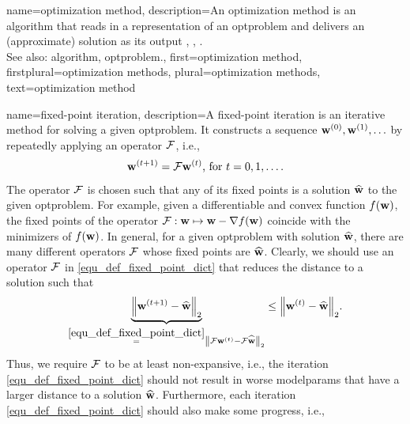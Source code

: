{name={optimization method},
	description={An optimization method is an \gls{algorithm} that 
		reads in a representation of an \gls{optproblem} and delivers an (approximate) solution 
		as its output \cite{BoydConvexBook}, \cite{BertsekasNonLinProgr}, \cite{nesterov04}.
		 \\
		 See also: \gls{algorithm}, \gls{optproblem}.},
	first={optimization method},
	firstplural={optimization methods}, 
	plural={optimization methods}, 
	text={optimization method}
}

{name={fixed-point iteration},
	description={A fixed-point iteration is an iterative method for solving 
		a given \gls{optproblem}. It constructs a sequence ${\bf w}^{(0)}, {\bf w}^{(1)}, \ldots$ by 
		 repeatedly applying an operator $\mathcal{F}$, i.e., 
		 \begin{equation} 
		 	\label{equ_def_fixed_point_dict} 
		 	{\bf w}^{(t+1)} = \mathcal{F} {\bf w}^{(t)} \mbox{, for } t=0, 1, \ldots.
		 \end{equation} 
		 The operator $\mathcal{F}$ is chosen such that any of its fixed points is a solution 
		 $\widehat{{\bf w}}$ to the given \gls{optproblem}. For example, given a \gls{differentiable} and 
		 \gls{convex} \gls{function} $f({\bf w})$, the fixed points of the operator $\mathcal{F}: {\bf w} \mapsto {\bf w} - \nabla f({\bf w})$ 
		 coincide with the minimizers of $f({\bf w})$. In general, for a given \gls{optproblem} with solution $\widehat{{\bf w}}$, 
		 there are many different operators $\mathcal{F}$ whose fixed points are $\widehat{{\bf w}}$. 
		 Clearly, we should use an operator $\mathcal{F}$ in \eqref{equ_def_fixed_point_dict} that reduces the distance to a solution such that
		 \begin{equation} 
			\nonumber
			\underbrace{\normgeneric{ \weights^{(\iteridx+1)} - \widehat{\netparams}}{2}}_{\stackrel{\eqref{equ_def_fixed_point_dict}}{=} \normgeneric{ \fixedpointop \weights^{(\iteridx)} - \fixedpointop\widehat{\weights}}{2}}  \leq 	\normgeneric{ \weights^{(\iteridx)} - \widehat{\weights}}{2}. 
		\end{equation}
		Thus, we require $\mathcal{F}$ to be at least non-expansive, i.e., the iteration \eqref{equ_def_fixed_point_dict} 
		should not result in worse \glspl{modelparam} that have a larger distance to a solution $\widehat{{\bf w}}$. 
		Furthermore, each iteration \eqref{equ_def_fixed_point_dict} should also make some progress, i.e., 
}}
